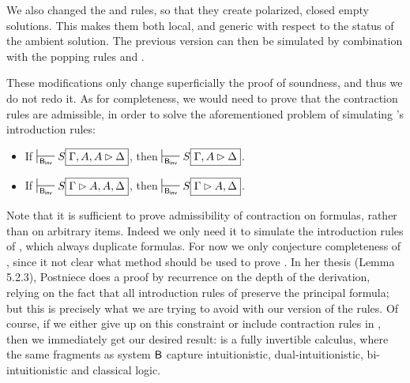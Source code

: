 \begin{remark}
  We also changed the \rsf{\bot{-}} and \rsf{\top{+}} rules, so that they create
  polarized, closed empty solutions. This makes them both local, and generic
  with respect to the status of the ambient solution. The previous version can
  then be simulated by combination with the popping rules  and
  .
\end{remark}

These modifications only change superficially the proof of soundness, and thus
we do not redo it. As for completeness, we would need to prove that the
contraction rules are admissible, in order to solve the aforementioned problem
of simulating 's introduction rules:

\begin{lemma}
  \sbr
  \begin{itemize}
    \item If $\prov{\msys{B_{inv}}} S\select{\Gamma, A, A \J \Delta}$, then
          $\prov{\msys{B_{inv}}} S\select{\Gamma, A \J \Delta}$.
    \item If $\prov{\msys{B_{inv}}} S\select{\Gamma \J A, A, \Delta}$, then
          $\prov{\msys{B_{inv}}} S\select{\Gamma \J A, \Delta}$.
  \end{itemize}
\end{lemma}

Note that it is sufficient to prove admissibility of contraction on formulas,
rather than on arbitrary items. Indeed we only need it to simulate the
introduction rules of , which always duplicate formulas. For now we
only conjecture completeness of , since it not clear what method
should be used to prove . In her thesis
\cite{postniece_proof_2010} (Lemma 5.2.3), Postniece does a proof by recurrence
on the depth of the derivation, relying on the fact that all introduction rules
of  preserve the principal formula; but this is precisely what we
are trying to avoid with our version of the rules. Of course, if we either give
up on this constraint or include contraction rules in , then we
immediately get our desired result:  is a fully invertible
calculus, where the same fragments as system $\sysB$ capture intuitionistic,
dual-intuitionistic, bi-intuitionistic and classical logic.


